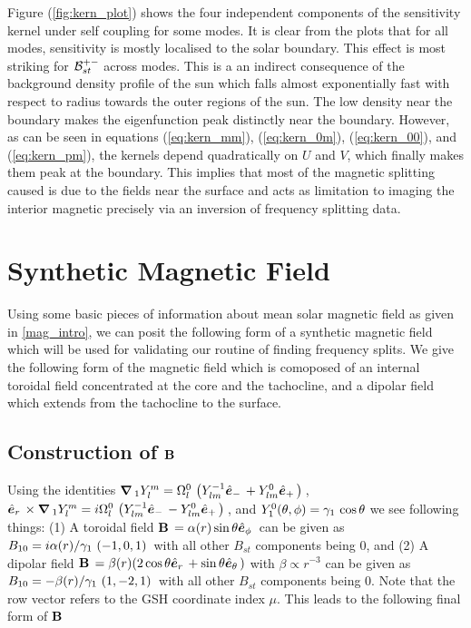 Figure (\ref{fig:kern_plot}) shows the four independent components of the sensitivity kernel under self coupling for some modes. It is clear from the plots that for all modes, sensitivity is mostly localised to the solar boundary. This effect is most striking for $\mathcal{B}^{+-}_{st}$ across modes. This is a an indirect consequence of the background density profile of the sun which falls almost exponentially fast with respect to radius towards the outer regions of the sun. The low density near the boundary makes the eigenfunction peak distinctly near the boundary. However, as can be seen in equations (\ref{eq:kern_mm}), (\ref{eq:kern_0m}), (\ref{eq:kern_00}), and (\ref{eq:kern_pm}), the kernels depend quadratically on $U$ and $V$, which finally makes them peak at the boundary. This implies that most of the magnetic splitting caused is due to the fields near the surface and acts as limitation to imaging the interior magnetic precisely via an inversion of frequency splitting data.


\section{Synthetic Magnetic Field}
Using some basic pieces of information about mean solar magnetic field as given in \ref{mag_intro}, we can posit the following form of a synthetic magnetic field which will be used for validating our routine of finding frequency splits. We give the following form of the magnetic field which is comoposed of an internal toroidal field concentrated at the core and the tachocline, and a dipolar field which extends from the tachocline to the surface.

\subsection{Construction of $\mathbf{B}\,$}\label{sec:B_construction}
Using the identities $\bm{\nabla}\,_1 Y_l^m = \Omega_{l}^{0}\, \left( Y_{lm}^{-1} \hat{\bm{e}}_{-}\, + Y_{lm}^0 \hat{\bm{e}}_{+}\, \right)\,$, $\hat{\bm{e}}_{r}\, \times\bm{\nabla}\,_1 Y_l^m = i\Omega_{l}^{0}\, \left( Y_{lm}^{-1} \hat{\bm{e}}_{-}\, - Y_{lm}^0 \hat{\bm{e}}_{+}\, \right)\,$, and $Y_1^0(\theta,\phi) = \gamma_{1}\,\cos\theta$ we see following things: (1) A toroidal field $\mathbf{B}\, = \alpha(r) \sin\theta \hat{\bm{e}}_{\phi}\,$ can be given as $B_{10} = i \alpha(r) / \gamma_{1}\, \left( -1,0,1 \right)\,$ with all other $B_{st}$ components being $0$, and (2) A dipolar field $\mathbf{B}\, = \beta(r) (2\cos\theta \hat{\bm{e}}_{r}\, + \sin\theta\hat{\bm{e}}_{\theta}\,)$ with $\beta \propto r^{-3}$ can be given as $B_{10} = -\beta(r)/\gamma_{1}\, \left( 1,-2,1 \right)\,$ with all other $B_{st}$ components being $0$. Note that the row vector refers to the GSH coordinate index $\mu$. This leads to the following final form of $\mathbf{B}\,$

